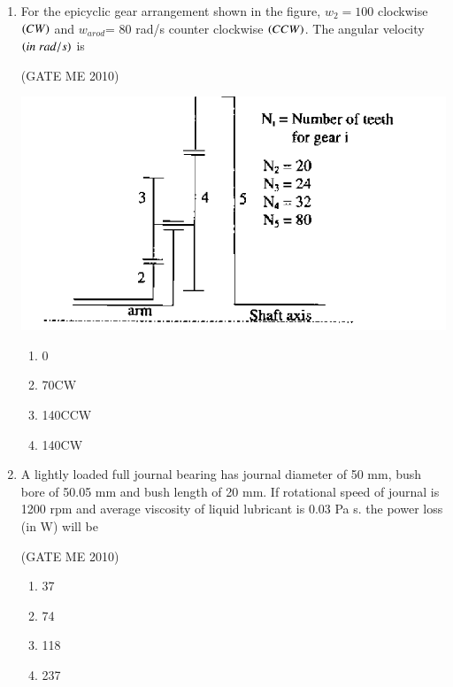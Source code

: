 \documentclass[journal,12pt,onecolumn]{IEEEtran}
\theoremstyle{remark}
\begin{document}
\begin{enumerate}
\hfill{(GATE  ME 2010)}


\begin{multicols}{4}
\begin{enumerate}
\item 0.1
\item 1.0
\item 0.3
\item 0.5
\end{enumerate}
\end{multicols}

\item For the epicyclic gear arrangement shown in the figure, $w_{2}=100$ clockwise $\left(CW\right)$ and $w_{arod}$= 80 rad/s counter clockwise $\left(CCW\right)$. The angular velocity $\left(in\;rad/s\right)$ is


\hfill{(GATE  ME 2010)}\\

\begin{center}
    \includegraphics[width=0.7\linewidth]{figs/fig3.png}
\end{center}
\begin{multicols}{4}
\begin{enumerate}
\item 0
\item 70CW
\item 140CCW
\item 140CW
\end{enumerate}
\end{multicols}


\item  A lightly loaded full journal bearing has journal diameter of 50 mm, bush bore of 50.05 mm and bush length of 20 mm. If rotational speed of journal is 1200 rpm and average viscosity of liquid lubricant is 0.03 Pa s. the power loss (in W) will be

\hfill{(GATE  ME 2010)}\\

\begin{multicols}{4}
\begin{enumerate}
    \item 37
    \item 74
    \item 118
    \item 237
\end{enumerate}
\end{multicols}


\end{enumerate}
\end{document}
